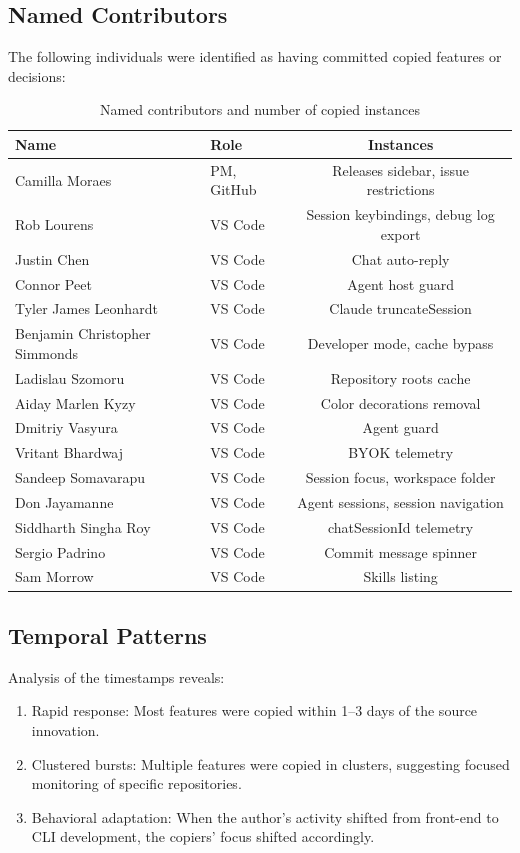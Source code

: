 \documentclass[12pt]{article}
\begin{document}
\subsection{Named Contributors}
The following individuals were identified as having committed copied features or decisions:
\begin{table}[h]
\centering
\begin{tabular}{|l|l|c|}
\hline
\textbf{Name} & \textbf{Role} & \textbf{Instances} \\
\hline
Camilla Moraes & PM, GitHub & Releases sidebar, issue restrictions \\
Rob Lourens & VS Code & Session keybindings, debug log export \\
Justin Chen & VS Code & Chat auto-reply \\
Connor Peet & VS Code & Agent host guard \\
Tyler James Leonhardt & VS Code & Claude truncateSession \\
Benjamin Christopher Simmonds & VS Code & Developer mode, cache bypass \\
Ladislau Szomoru & VS Code & Repository roots cache \\
Aiday Marlen Kyzy & VS Code & Color decorations removal \\
Dmitriy Vasyura & VS Code & Agent guard \\
Vritant Bhardwaj & VS Code & BYOK telemetry \\
Sandeep Somavarapu & VS Code & Session focus, workspace folder \\
Don Jayamanne & VS Code & Agent sessions, session navigation \\
Siddharth Singha Roy & VS Code & chatSessionId telemetry \\
Sergio Padrino & VS Code & Commit message spinner \\
Sam Morrow & VS Code & Skills listing \\
\hline
\end{tabular}
\caption{Named contributors and number of copied instances}
\end{table}

\subsection{Temporal Patterns}
Analysis of the timestamps reveals:
\begin{enumerate}
\item Rapid response: Most features were copied within 1--3 days of the source innovation.
\item Clustered bursts: Multiple features were copied in clusters, suggesting focused monitoring of specific repositories.
\item Behavioral adaptation: When the author's activity shifted from front-end to CLI development, the copiers' focus shifted accordingly.
\end{enumerate}
\end{document}
